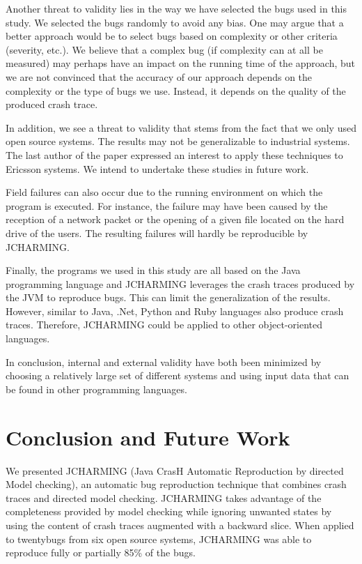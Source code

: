 \documentclass[times]{smrauth}
\begin{document}
Another threat to validity lies in the way we have selected the
bugs used in this study. We selected the bugs randomly to
avoid any bias. One may argue that a better approach would
be to select bugs based on complexity or other criteria
(severity, etc.). We believe that a complex bug (if complexity
can at all be measured) may perhaps have an impact on the
running time of the approach, but we are not convinced that
the accuracy of our approach depends on the complexity or the
type of bugs we use. Instead, it depends on the quality of the
produced crash trace.

In addition, we see a threat to validity that stems from the fact
that we only used open source systems. The results may not be
generalizable to industrial systems. The last author of the
paper expressed an interest to apply these techniques to
Ericsson systems. We intend to undertake these studies in
future work.

Field failures can also occur due to the running environment
on which the program is executed. For instance, the failure
may have been caused by the reception of a network packet or
the opening of a given file located on the hard drive of the
users. The resulting failures will hardly be reproducible by
JCHARMING.

Finally, the programs we used in this study are all based on
the Java programming language and JCHARMING leverages
the crash traces produced by the JVM to reproduce bugs. This
can limit the generalization of the results. However, similar to
Java, .Net, Python and Ruby languages also produce crash
traces. Therefore, JCHARMING could be applied to other
object-oriented languages.

In conclusion, internal and external validity have both been
minimized by choosing a relatively large set of different
systems and using input data that can be found in other
programming languages.

\section{Conclusion and Future Work}

We presented JCHARMING (Java CrasH Automatic
Reproduction by directed Model checking), an automatic bug
reproduction technique that combines crash traces and
directed model checking. JCHARMING takes advantage of
the completeness provided by model checking while ignoring
unwanted states by using the content of crash traces
augmented with a backward slice. When applied to twentybugs from six open source systems, JCHARMING was able to
reproduce fully or partially 85\% of the bugs.
\end{document}
